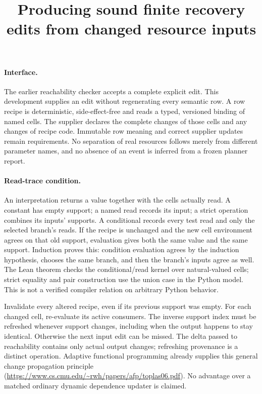 \documentclass{article}
\title{Producing sound finite recovery edits from changed resource inputs}
\author{}\date{}
\begin{document}
\maketitle
\paragraph{Interface.}
The earlier reachability checker accepts a complete explicit edit. This
development supplies an edit without regenerating every semantic row.
A row recipe is deterministic, side-effect-free and reads a typed,
versioned binding of named cells. The supplier declares the complete
changes of those cells and any changes of recipe code. Immutable
row meaning and correct supplier updates remain requirements. No
separation of real resources follows merely from different parameter names,
and no absence of an event is inferred from a frozen planner report.

\paragraph{Read-trace condition.}
An interpretation returns a value together with the cells actually read.
A constant has empty support; a named read records its input; a strict
operation combines its inputs' supports. A conditional records every
test read and only the selected branch's reads. If the recipe is unchanged
and the new cell environment agrees on that old support, evaluation gives
both the same value and the same support. Induction proves this: condition
evaluation agrees by the induction hypothesis, chooses the same branch,
and then the branch's inputs agree as well. The Lean theorem checks the
conditional/read kernel over natural-valued cells; strict equality and
pair construction use the union case in the Python model. This is not a
verified compiler relation on arbitrary Python behavior.

Invalidate every altered recipe, even if its previous support was empty.
For each changed cell, re-evaluate its active consumers. The inverse
support index must be refreshed whenever support changes, including when
the output happens to stay identical. Otherwise the next input edit
can be missed. The delta passed to reachability contains only actual
output changes; refreshing provenance is a distinct operation.
Adaptive functional programming already supplies this general change
propagation principle (\url{https://www.cs.cmu.edu/~rwh/papers/afp/toplas06.pdf}).
No advantage over a matched ordinary dynamic dependence updater is claimed.
\end{document}

